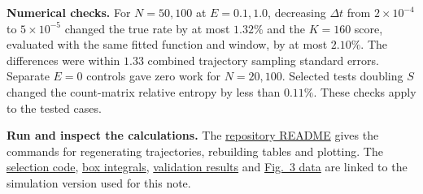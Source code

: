 \documentclass[11pt,letterpaper]{article}
\newcommand{\source}[2]{\href{https://github.com/ruichengbao/measuring_irreversibility_counting/blob/e868697ff37a81a72f4ee47956546a0e9cc1604c/#1}{#2}}
\begin{document}
\textbf{Numerical checks.}
For $N=50,100$ at $E=0.1,1.0$, decreasing $\Delta t$ from $2\times10^{-4}$ to
$5\times10^{-5}$ changed the true rate by at most $1.32\%$ and the $K=160$ score, evaluated
with the same fitted function and window, by at most $2.10\%$. The differences were within
$1.33$ combined trajectory sampling standard errors. Separate $E=0$ controls gave zero work
for $N=20,100$. Selected tests doubling $S$ changed the count-matrix relative entropy by
less than $0.11\%$. These checks apply to the tested cases.

\textbf{Run and inspect the calculations.}
The \source{README.md}{repository README} gives the commands for regenerating trajectories,
rebuilding tables and plotting. The \source{numerics/Fig3_corrected/analysis/analyze_group.py}{selection code},
\source{numerics/Fig3_corrected/analysis/positive_kernel.py}{box integrals},
\source{numerics/Fig3_corrected/validation/validation_summary.json}{validation results} and
\source{numerics/Fig3_grid_update/plotting_tables/fig3_K20_summary.csv}{Fig.~3 data}
are linked to the simulation version used for this note.
\end{document}
